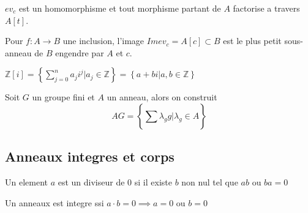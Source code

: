 \documentclass[../main.tex]{subfiles}
\begin{document}
\begin{propo}
	$ev_c$ est un homomorphisme et tout morphisme partant de $A$ factorise a travers $A[t]$.

\end{propo}
\begin{defn}
	Pour $f: A\to B$ une inclusion,
	l'image $Im ev_c= A[c] \subset B$ est le plus petit sous-anneau de $B$ engendre par $A$ et $c$.
\end{defn}
\begin{exemple}
$\mathbb{Z}[i]= \left\{ \sum_{j=0}^{ n}a_j i^{j}| a_j \in \mathbb{Z} \right\} = \left\{a+bi| a,b \in \mathbb{Z} \right\} $ 	
\end{exemple}
\begin{exemple}
	Soit $G$ un groupe fini et $A$ un anneau, alors on construit
	\[ 
	AG= \left\{ \sum_{}^{ } \lambda_g g| \lambda_g \in A \right\} 
\]
	
\end{exemple}
\subsection{Anneaux integres et corps}
\begin{defn}[Diviseurs de 0]
	Un element $a$ est un diviseur de $0$  si il existe $b$ non nul tel que $ab$ ou $ba =0$ 
\end{defn}
\begin{defn}
	Un anneaux est integre ssi $a\cdot b = 0 \implies a=0$ ou $b=0$ 
\end{defn}
\end{document}
